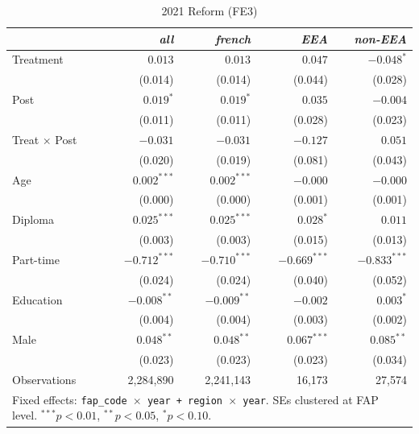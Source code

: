 \documentclass[10pt, a4paper]{article}
\begin{document}
\begin{table}[H]
\caption{2021 Reform (FE3)\label{tab:did2021_fe3}}
\centering
\setlength{\tabcolsep}{25pt}
\begin{tabular}{l|rrrr}
 & \textit{all} & \textit{french} & \textit{EEA} & \textit{non-EEA} \\
\midrule
\midrule
Treatment & $0.013$ & $0.013$ & $0.047$ & $-0.048^{*}$ \\
 & (0.014) & (0.014) & (0.044) & (0.028) \\[2pt]
Post & $0.019^{*}$ & $0.019^{*}$ & $0.035$ & $-0.004$ \\
 & (0.011) & (0.011) & (0.028) & (0.023) \\[2pt]
Treat$\,\times\,$Post & $-0.031$ & $-0.031$ & $-0.127$ & $0.051$ \\
 & (0.020) & (0.019) & (0.081) & (0.043) \\[2pt]
\midrule
Age & $0.002^{***}$ & $0.002^{***}$ & $-0.000$ & $-0.000$ \\
 & (0.000) & (0.000) & (0.001) & (0.001) \\[2pt]
Diploma & $0.025^{***}$ & $0.025^{***}$ & $0.028^{*}$ & $0.011$ \\
 & (0.003) & (0.003) & (0.015) & (0.013) \\[2pt]
Part-time & $-0.712^{***}$ & $-0.710^{***}$ & $-0.669^{***}$ & $-0.833^{***}$ \\
 & (0.024) & (0.024) & (0.040) & (0.052) \\[2pt]
Education & $-0.008^{**}$ & $-0.009^{**}$ & $-0.002$ & $0.003^{*}$ \\
 & (0.004) & (0.004) & (0.003) & (0.002) \\[2pt]
Male & $0.048^{**}$ & $0.048^{**}$ & $0.067^{***}$ & $0.085^{**}$ \\
 & (0.023) & (0.023) & (0.023) & (0.034) \\[2pt]
\midrule
Observations & 2{,}284{,}890 & 2{,}241{,}143 & 16{,}173 & 27{,}574 \\
\bottomrule
\multicolumn{5}{p{0.88\linewidth}}{\footnotesize Fixed effects: \texttt{fap\_code $\times$ year + region $\times$ year}. SEs clustered at FAP level. $^{***}p<0.01$, $^{**}p<0.05$, $^{*}p<0.10$.}\\
\end{tabular}
\end{table}
\clearpage
\end{document}
